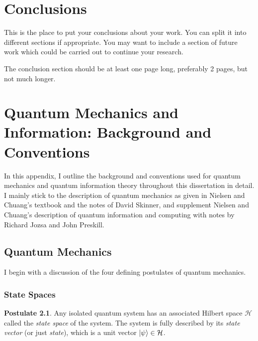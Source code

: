 \documentclass[12pt,a4paper]{report}
\numberwithin{equation}{section}
\theoremstyle{definition}
\theoremstyle{theorem}
\theoremstyle{theorem}
\theoremstyle{example}
\theoremstyle{definition}
\newtheorem{postulate}{Postulate}
\begin{document}
\chapter{Conclusions}

This is the place to put your conclusions about your work. You can
split it into different sections if appropriate. You may want to include
a section of future work which could be carried out to continue your
research.

The conclusion section should be at least one page long, preferably 2
pages, but not much longer.

\appendix

\chapter{Quantum Mechanics and Information: Background and Conventions}

In this appendix, I outline the background and conventions used for quantum mechanics and quantum information theory throughout this dissertation in detail. I mainly stick to the description of quantum mechanics as given in Nielsen and Chuang's textbook \cite{NielsenChuang} and the notes of David Skinner, and supplement Nielsen and Chuang's description of quantum information and computing with notes by Richard Jozsa and John Preskill.


\section{Quantum Mechanics}
\label{sec:QM}

I begin with a discussion of the four defining postulates of quantum mechanics.

\subsection{State Spaces}

\begin{postulate}
	Any isolated quantum system has an associated Hilbert space $\mathcal{H}$ called the \textit{state space} of the system. The system is fully described by its \textit{state vector} (or just \textit{state}), which is a unit vector $\ket{\psi}\in\mathcal{H}$.
\end{postulate}
\end{document}
